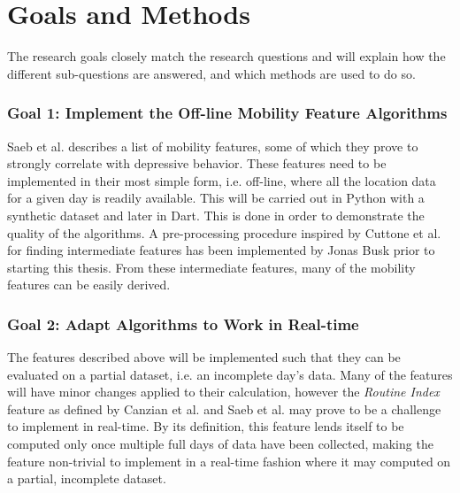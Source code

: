 \section{Goals and Methods}


The research goals closely match the research questions and will explain how the different sub-questions are answered, and which methods are used to do so.

\subsubsection*{Goal 1: Implement the Off-line Mobility Feature Algorithms}
Saeb et al. \cite{Saeb2015} describes a list of mobility features, some of which they prove to strongly correlate with depressive behavior. These features need to be implemented in their most simple form, i.e. off-line, where all the location data for a given day is readily available. This will be carried out in Python with a synthetic dataset and later in Dart. This is done in order to demonstrate the quality of the algorithms. A pre-processing procedure inspired by Cuttone et al. \cite{sparse-location-2014} for finding intermediate features has been implemented by Jonas Busk prior to starting this thesis. From these intermediate features, many of the mobility features can be easily derived. 

\subsubsection*{Goal 2: Adapt Algorithms to Work in Real-time}
The features described above will be implemented such that they can be evaluated on a partial dataset, i.e. an incomplete day's data. Many of the features will have minor changes applied to their calculation, however the \textit{Routine Index} feature as defined by Canzian et al.\cite{Canzian2015} and Saeb et al. \cite{Saeb2015} may prove to be a challenge to implement in real-time. By its definition, this feature lends itself to be computed only once multiple full days of data have been collected, making the feature non-trivial to implement in a real-time fashion where it may computed on a partial, incomplete dataset. 

